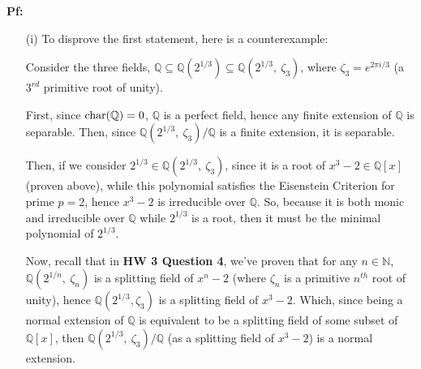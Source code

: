 \documentclass{article}
\begin{document}
\textbf{Pf:}
\begin{itemize}
    \item[(i)] To disprove the first statement, here is a counterexample:
    
    Consider the three fields, $\mathbb{Q}\subseteq \mathbb{Q}(2^{1/3})\subseteq \mathbb{Q}(2^{1/3},\ \zeta_3)$, where $\zeta_3 = e^{2\pi i/3}$ (a $3^{rd}$ primitive root of unity).

    First, since $\textmd{char}(\mathbb{Q})=0$, $\mathbb{Q}$ is a perfect field, hence any finite extension of $\mathbb{Q}$ is separable. Then, since $\mathbb{Q}(2^{1/3},\ \zeta_3)/\mathbb{Q}$ is a finite extension, it is separable.

    Then, if we consider $2^{1/3}\in\mathbb{Q}(2^{1/3},\ \zeta_3)$, since it is a root of $x^3-2\in\mathbb{Q}[x]$ (proven above), while this polynomial satisfies the Eisenstein Criterion for prime $p=2$, hence $x^3-2$ is irreducible over $\mathbb{Q}$. So, because it is both monic and irreducible over $\mathbb{Q}$ while $2^{1/3}$ is a root, then it must be the minimal polynomial of $2^{1/3}$.
    \begin{comment}
    Now, notice that over $\mathbb{C}$, $2^{1/3}\cdot e^{2\pi i\cdot k/3} = 2^{1/3}\cdot \zeta_3^k$ (for integers $k=0,1,2$) creates three distinct roots of $x^3-2$, while $x^3-2$ has at most $3$ distinct roots, hence these are all the roots of $x^3-2$ over $\mathbb{C}$. Which, because they can be generated through finite products of $2^{1/3}$ and $\zeta_3$, then all roots of $x^3-2$ over $\mathbb{C}$ exist in $\mathbb{Q}(2^{1/3},\ \zeta_3)$, showing that $x^3-2$ splits completely over $\mathbb{Q}(2^{1/3},\ \zeta_3)$; on the other hand, since the splitting field of $x^3-2$ over $\mathbb{C}$ can be generated as $\mathbb{Q}(2^{1/3},\ 2^{1/3}\zeta_3,\ 2^{1/3}\zeta_3^2)$ (adjoining $\mathbb{Q}$ with all the roots of $x^3-2$), because $\zeta_3 = (2^{1/3}\zeta_3)/2^{1/3}\in \mathbb{Q}(2^{1/3},\ 2^{1/3}\zeta_3,\ 2^{1/3}\zeta_3^2)$, this shows that $\mathbb{Q}(2^{1/3},\zeta_3)\subseteq \mathbb{Q}(2^{1/3},\ 2^{1/3}\zeta_3,\ 2^{1/3}\zeta_3^2)$, which by the definition of splitting field, $\mathbb{Q}(2^{1/3},\zeta_3)= \mathbb{Q}(2^{1/3},\ 2^{1/3}\zeta_3,\ 2^{1/3}\zeta_3^2)$. So, $\mathbb{Q}(2^{1/3},\ \zeta_3)$ is indeed a splitting field of $x^3-2$, the minimal polynomial of $2^{1/3}$ over $\mathbb{Q}$. 
    \end{comment}
    Now, recall that in \textbf{HW 3 Question 4}, we've proven that for any $n\in\mathbb{N}$, $\mathbb{Q}(2^{1/n},\ \zeta_n)$ is a splitting field of $x^n-2$ (where $\zeta_n$ is a primitive $n^{th}$ root of unity), hence $\mathbb{Q}(2^{1/3},\zeta_3)$ is a splitting field of $x^3-2$. Which, since being a normal extension of $\mathbb{Q}$ is equivalent to be a splitting field of some subset of $\mathbb{Q}[x]$, then $\mathbb{Q}(2^{1/3},\ \zeta_3)/\mathbb{Q}$ (as a splitting field of $x^3-2$) is a normal extension.


\end{itemize}
\end{document}
